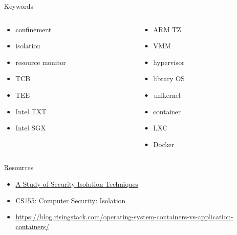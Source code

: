 \documentclass{curs}
\begin{document}
\begin{frame}{Keywords}
  \begin{columns}
    \begin{column}{0.5\textwidth}
      \begin{itemize}
        \item confinement
        \item isolation
        \item resource monitor
        \item TCB
        \item TEE
        \item Intel TXT
        \item Intel SGX
      \end{itemize}
    \end{column}
    \begin{column}{0.5\textwidth}
      \begin{itemize}
        \item ARM TZ
        \item VMM
        \item hypervisor
        \item library OS
        \item unikernel
        \item container
        \item LXC
        \item Docker
      \end{itemize}
    \end{column}
  \end{columns}
\end{frame}

\begin{frame}{Resources}
  \begin{itemize}
    \item \href{https://dl.acm.org/citation.cfm?id=2988545}{A Study of Security Isolation Techniques}
    \item \href{https://crypto.stanford.edu/cs155/lectures/03-isolation.pdf}{CS155: Computer Security: Isolation}
    \item \url{https://blog.risingstack.com/operating-system-containers-vs-application-containers/}
  \end{itemize}
\end{frame}
\end{document}
